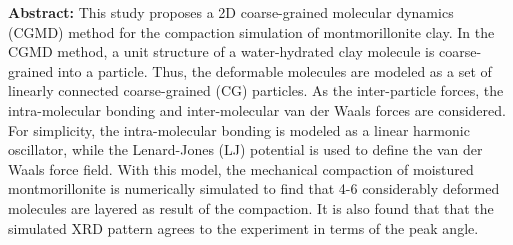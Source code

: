 ﻿\documentclass[11pt,a4j]{jarticle}
\begin{document}
\begin{center}
\begin{minipage}{0.9\hsize}
{\bf Abstract:}
This study proposes a 2D coarse-grained molecular dynamics (CGMD) method for the compaction simulation of montmorillonite clay.
In the CGMD method, a unit structure of a water-hydrated clay molecule is coarse-grained into a particle.
Thus, the deformable molecules are modeled as a set of linearly connected coarse-grained (CG) particles.
As the inter-particle forces, the intra-molecular bonding and inter-molecular van der Waals forces are considered.
For simplicity, the intra-molecular bonding is modeled as a linear harmonic oscillator, while the Lenard-Jones (LJ) potential 
is used to define the van der Waals force field. 
With this model, the mechanical compaction of moistured montmorillonite is numerically simulated to find 
that 4-6 considerably deformed molecules are layered as result of the compaction.
It is also found that that the simulated XRD pattern agrees to the experiment in terms of the peak angle. 
\end{minipage}
\end{center}
\end{document}
